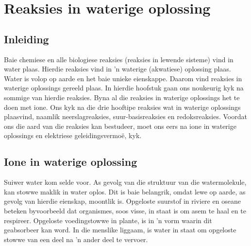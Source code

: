 \chapter{Reaksies in waterige oplossing}
\label{chap:rxnsaq}
\section{Inleiding}

Baie chemiese en alle biologiese reaksies (reaksies in lewende sisteme) vind in water plaas. Hierdie reaksies vind in  'n waterige (akwatiese) oplossing plaas.  Water is volop op aarde en het baie unieke eienskappe. Daarom vind reaksies in waterige oplossings gereeld plaas. In hierdie hoofstuk gaan ons noukeurig kyk na sommige van hierdie reaksies. Byna al die reaksies in waterige oplossings het te doen met ione.  Ons kyk na die drie hooftipe reaksies wat in waterige oplossings plaasvind, naamlik neerslagreaksies, suur-basisreaksies en redoksreaksies. Voordat ons die aard van die reaksies kan bestudeer, moet ons eers na ione in waterige oplossings en elektriese geleidingsvermo\"{e}, kyk.
\label{m38720*cid6}
            \section{Ione in waterige oplossing}
            \nopagebreak
Suiwer water kom selde voor.  As gevolg van die struktuur van die watermolekule, kan stowwe maklik in water oplos.  Dit is baie belangrik, omdat lewe op aarde, as gevolg van hierdie eienskap, moontlik is.  Opgeloste suurstof in riviere en oseane beteken byvoorbeeld dat organismes, soos visse, in staat is om asem te haal en te respireer.  Opgeloste voedingstowwe in plante, is in  'n vorm waarin dit geabsorbeer kan word.  In die menslike liggaam, is water in staat om opgeloste stowwe van een deel na  'n ander deel te vervoer. 
      \label{m38720*uid19}
